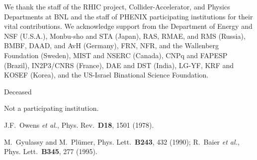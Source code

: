\begin{multicols}{2}
%


We thank the staff of the RHIC project, Collider-Accelerator, and Physics
Departments at BNL and the staff of PHENIX participating institutions for
their vital contributions.  We acknowledge support from the Department of
Energy and NSF (U.S.A.), Monbu-sho and STA (Japan), RAS, RMAE, and RMS
(Russia), BMBF, DAAD, and AvH (Germany), FRN, NFR, and the Wallenberg
Foundation (Sweden), MIST and NSERC (Canada), CNPq and FAPESP (Brazil),
IN2P3/CNRS (France), DAE and DST (India), LG-YF, KRF and KOSEF (Korea),
and the US-Israel Binational Science Foundation.


\begin{references}

\def\IJMPA{{Int. J. Mod. Phys.}~{\bf A}}
\def\JPG{{J. Phys}~{\bf G}}
\def\NCA{Nuovo Cimento}
\def\NIM{Nucl. Instrum. Methods}
\def\NIMA{{Nucl. Instrum. Methods}~{\bf A}}
\def\NPA{{Nucl. Phys.}~{\bf A}}
\def\NPB{{Nucl. Phys.}~{\bf B}}
\def\PLB{{Phys. Lett.}~{\bf B}}
\def\PLC{Phys. Repts.\ }
\def\PRL{Phys. Rev. Lett.\ }
\def\PRD{{Phys. Rev.}~{\bf D}}
\def\PRC{{Phys. Rev.}~{\bf C}}
\def\ZPC{{Z. Phys.}~{\bf C}}

Deceased     %

Not a participating institution.

         J.F.~Owens {\it et al.}, \PRD{\bf 18}, 1501 
(1978).

 M.~Gyulassy and M.~Pl\"umer, \PLB{\bf 243}, 432
(1990); R.~Baier {\it et al.}, \PLB{\bf 345}, 277 (1995).


\end{references}
\end{multicols}
